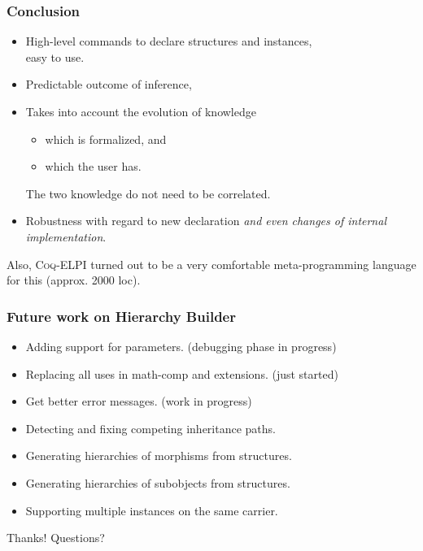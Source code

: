 \documentclass[11pt]{beamer}
\begin{document}
\begin{frame}
  \frametitle{Conclusion}

  \begin{itemize}
  \item High-level commands to declare structures and instances, \\
    easy to use.
    \vfill
  \item Predictable outcome of inference,
    \vfill
  \item Takes into account the evolution of knowledge
    \begin{itemize}
    \item which is formalized, and
    \item which the user has.
    \end{itemize}
    The two knowledge do not need to be correlated.
    \vfill
  \item Robustness with regard to new declaration \emph{and even changes of
    internal implementation}.
  \end{itemize}

  \vfill\pause
  Also, \textsc{Coq-ELPI} turned out to be a very comfortable
  meta-programming language for this (approx. 2000 loc).

\end{frame}

\begin{frame}
  \frametitle{Future work on Hierarchy Builder}
  \begin{itemize}
  \item Adding support for parameters. (debugging phase in progress)
    \vfill
  \item Replacing all uses in math-comp and extensions. (just started)
    \vfill
  \item Get better error messages. (work in progress)
    \vfill
  \item Detecting and fixing competing inheritance paths.
    \vfill
  \item Generating hierarchies of morphisms from structures.
    \vfill
  \item Generating hierarchies of subobjects from structures.
    \vfill
  \item Supporting multiple instances on the same carrier.
  \end{itemize}
\end{frame}

\begin{frame}
  \begin{center}
   {\huge Thanks! Questions?}
  \end{center}
\end{frame}
\end{document}
